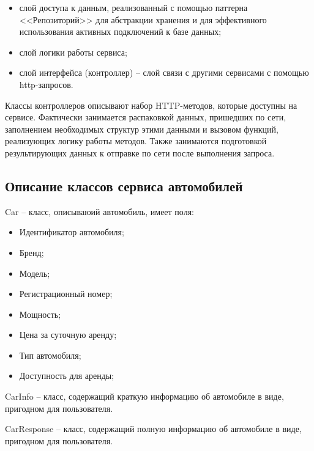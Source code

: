 \begin{itemize}
	\item слой доступа к данным, реализованный с помощью паттерна <<Репозиторий>> для абстракции хранения и для эффективного использования активных подключений к базе данных;
	
	\item слой логики работы сервиса;
	
	\item слой интерфейса (контроллер) -- слой связи с другими сервисами с помощью http-запросов.
\end{itemize}

Классы контроллеров описывают набор HTTP-методов, которые доступны на сервисе. Фактически занимается распаковкой данных, пришедших по сети, заполнением необходимых структур этими данными и вызовом функций, реализующих логику работы методов. Также занимаются подготовкой результирующих данных к отправке по сети после выполнения запроса.

\subsection*{Описание классов сервиса автомобилей}

Car -- класс, описываюий автомобиль, имеет поля:

\begin{itemize}
	\item Идентификатор автомобиля;
	
	\item Бренд;
	
	\item Модель;
	
	\item Регистрационный номер;
	
	\item Мощность;
	
	\item Цена за суточную аренду;
	
	\item Тип автомобиля;
	
	\item Доступность для аренды;
\end{itemize}

CarInfo -- класс, содержащий краткую информацию об автомобиле в виде, пригодном для пользователя.

CarResponse -- класс, содержащий полную информацию об автомобиле в виде, пригодном для пользователя.

